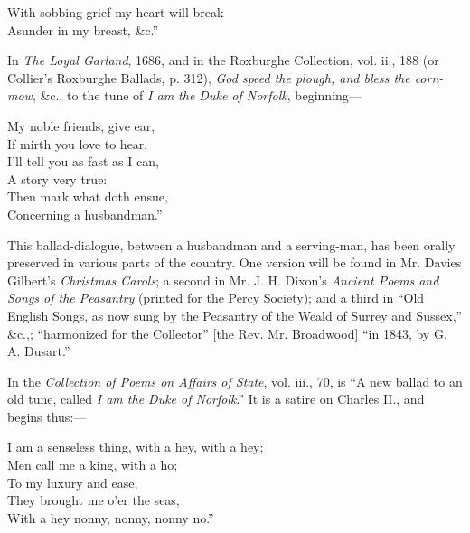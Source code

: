 \settowidth{\versewidth}{With sobbing grief my heart will break}
\begin{scverse}
With sobbing grief my heart will break\\
Asunder in my breast, \&c.”
\end{scverse}

In \textit{The Loyal Garland}, 1686, and in the Roxburghe Collection, vol. ii., 188 (or
Collier’s Roxburghe Ballads, p. 312), \textit{God speed the plough, and bless the corn-mow},
\&c., to the tune of \textit{I am the Duke of Norfolk}, beginning—

\settowidth{\versewidth}{My noble friends, give ear,}
\begin{scverse}
\begin{patverse}
My noble friends, give ear,\\
If mirth you love to hear,\\
I’ll tell you as fast as I can,\\
A story very true:\\
Then mark what doth ensue,\\
Concerning a husbandman.”
\end{patverse}
\end{scverse}
This ballad-dialogue, between a husbandman and a serving-man, has been orally
preserved in various parts of the country. One version will be found in Mr. Davies
Gilbert’s \textit{Christmas Carols}; a second in Mr. J. H. Dixon’s \textit{Ancient Poems and
Songs of the Peasantry} (printed for the Percy Society); and a third in “Old
English Songs, as now sung by the Peasantry of the Weald of Surrey and Sussex,”
\&c.,; “harmonized for the Collector” [the Rev. Mr. Broadwood] “in 1843, by
G. A. Dusart.”

In the \textit{Collection of Poems on Affairs of State}, vol. iii., 70, is “A new ballad
to an old tune, called \textit{I am the Duke of Norfolk}.” It is a satire on Charles II.,
and begins thus:—

\settowidth{\versewidth}{I am a senseless thing, with a hey, with a hey;}
\begin{scverse}
\begin{patverse}
I am a senseless thing, with a hey, with a hey;\\
Men call me a king, with a ho;\\
To my luxury and ease,\\
They brought me o’er the seas,\\
With a hey nonny, nonny, nonny no.”
\end{patverse}
\end{scverse}


